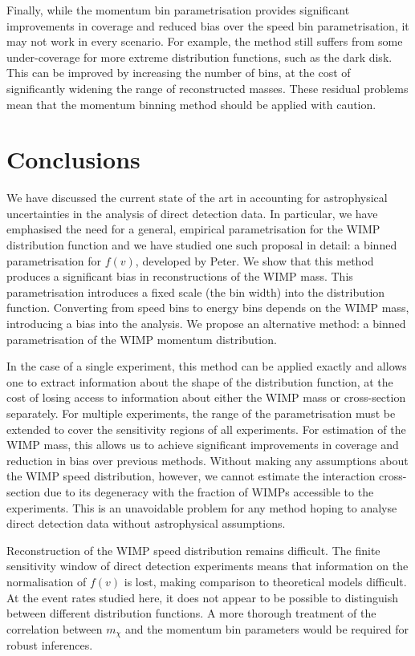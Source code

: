Finally, while the momentum bin parametrisation provides significant improvements in coverage and reduced bias over the speed bin parametrisation, it may not work in every scenario. For example, the method still suffers from some under-coverage for more extreme distribution functions, such as the dark disk. This can be improved by increasing the number of bins, at the cost of significantly widening the range of reconstructed masses. These residual problems mean that the momentum binning method should be applied with caution.

\section{Conclusions}
\label{sec:Speed:Conclusion}

We have discussed the current state of the art in accounting for astrophysical uncertainties in the analysis of direct detection data. In particular, we have emphasised the need for a general, empirical parametrisation for the WIMP distribution function and we have studied one such proposal in detail: a binned parametrisation for $f(v)$, developed by Peter. We show that this method produces a significant bias in reconstructions of the WIMP mass. This parametrisation introduces a fixed scale (the bin width) into the distribution function. Converting from speed bins to energy bins depends on the WIMP mass, introducing a bias into the analysis. We propose an alternative method: a binned parametrisation of the WIMP momentum distribution.

In the case of a single experiment, this method can be applied exactly and allows one to extract information about the shape of the distribution function, at the cost of losing access to information about either the WIMP mass or cross-section separately. For multiple experiments, the range of the parametrisation must be extended to cover the sensitivity regions of all experiments. For estimation of the WIMP mass, this allows us to achieve significant improvements in coverage and reduction in bias over previous methods. Without making any assumptions about the WIMP speed distribution, however, we cannot estimate the interaction cross-section due to its degeneracy with the fraction of WIMPs accessible to the experiments. This is an unavoidable problem for any method hoping to analyse direct detection data without astrophysical assumptions.

Reconstruction of the WIMP speed distribution remains difficult. The finite sensitivity window of direct detection experiments means that information on the normalisation of \(f(v)\) is lost, making comparison to theoretical models difficult. At the event rates studied here, it does not appear to be possible to distinguish between different distribution functions. A more thorough treatment of the correlation between $m_\chi$ and the momentum bin parameters would be required for robust inferences.

